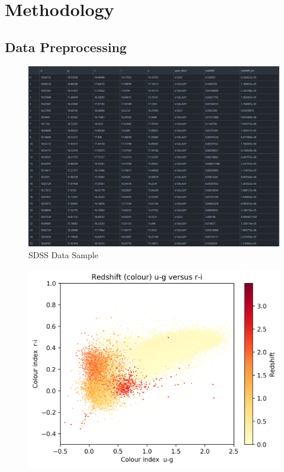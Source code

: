 \documentclass{beamer}
\begin{document}
\section{Methodology}
\subsection{Data Preprocessing}
\begin{frame}
    \begin{figure}
        \includegraphics[scale=0.3]{img/sdss_csv_data.png}
        \caption*{SDSS Data Sample}
    \end{figure}
    \end{frame}
\begin{frame}
    \begin{figure}
        \includegraphics[scale=0.2]{img/redshiftug.png}
    \end{figure}
    \end{frame}
\end{document}
